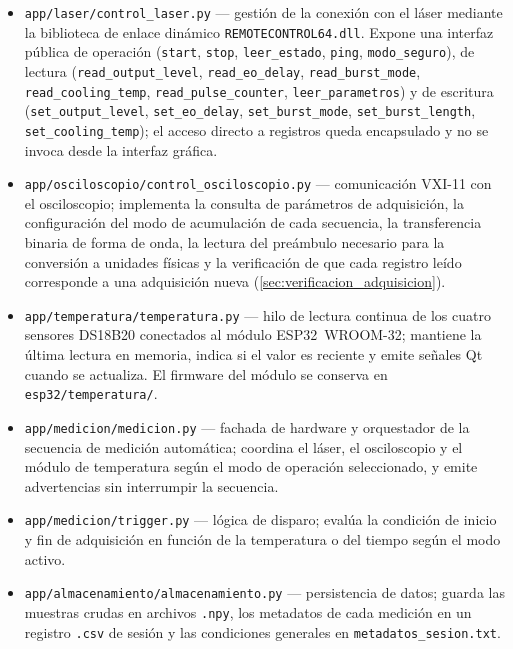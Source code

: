 {\sloppy
\begin{itemize}
  \item \texttt{app/laser/control\_laser.py} — gestión de la conexión
    con el láser mediante la biblioteca de enlace dinámico
    \texttt{REMOTECONTROL64.dll}. Expone una interfaz pública de
    operación (\texttt{start}, \texttt{stop}, \texttt{leer\_estado},
    \texttt{ping}, \texttt{modo\_seguro}), de lectura
    (\texttt{read\_output\_level}, \texttt{read\_eo\_delay},
    \texttt{read\_burst\_mode}, \texttt{read\_cooling\_temp},
    \texttt{read\_pulse\_counter}, \texttt{leer\_parametros}) y de
    escritura (\texttt{set\_output\_level}, \texttt{set\_eo\_delay},
    \texttt{set\_burst\_mode}, \texttt{set\_burst\_length},
    \texttt{set\_cooling\_temp}); el acceso directo a registros queda
    encapsulado y no se invoca desde la interfaz gráfica.

  \item \texttt{app/osciloscopio/control\_osciloscopio.py} —
    comunicación VXI-11 con el osciloscopio; implementa la consulta de
    parámetros de adquisición, la configuración del modo de acumulación
    de cada secuencia, la transferencia binaria de forma de onda, la
    lectura del preámbulo necesario para la conversión a unidades
    físicas y la verificación de que cada registro leído corresponde a
    una adquisición nueva (\cref{sec:verificacion_adquisicion}).

  \item \texttt{app/temperatura/temperatura.py} — hilo de lectura
    continua de los cuatro sensores DS18B20 conectados al módulo
    ESP32~WROOM-32; mantiene la última lectura en memoria, indica si el
    valor es reciente y emite señales Qt cuando se actualiza. El
    firmware del módulo se conserva en \texttt{esp32/temperatura/}.

  \item \texttt{app/medicion/medicion.py} — fachada de hardware y
    orquestador de la secuencia de medición automática; coordina el
    láser, el osciloscopio y el módulo de temperatura según el modo de
    operación seleccionado, y emite advertencias sin interrumpir la
    secuencia.

  \item \texttt{app/medicion/trigger.py} — lógica de disparo; evalúa
    la condición de inicio y fin de adquisición en función de la
    temperatura o del tiempo según el modo activo.

  \item \texttt{app/almacenamiento/almacenamiento.py} — persistencia
    de datos; guarda las muestras crudas en archivos \texttt{.npy}, los
    metadatos de cada medición en un registro \texttt{.csv} de sesión y
    las condiciones generales en \texttt{metadatos\_sesion.txt}.


\end{itemize}}
